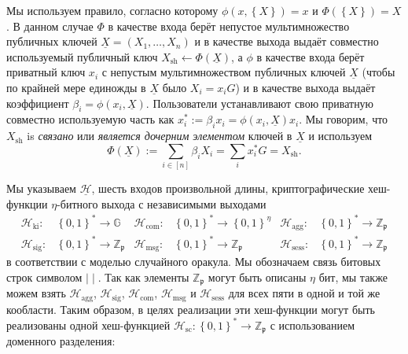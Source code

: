 \documentclass{mrl}
\theoremstyle{definition}
\numberwithin{theorem}{subsection}
\newcommand{\scalarField}{\mathbb{Z}_{\mathfrak{p}}}
\newcommand{\group}{\mathbb{G}}
\begin{document}
Мы используем правило, согласно которому $\phi(x, \left\{X\right\}) = x$ и $\Phi(\left\{X\right\}) = X$. В данном случае $\Phi$ в качестве входа берёт непустое мультимножество публичных ключей $\underline{X} = (X_1, \ldots, X_n)$ и в качестве выхода выдаёт совместно используемый публичный ключ $X_{\text{sh}} \leftarrow \Phi(\underline{X})$, а $\phi$ в качестве входа берёт приватный ключ $x_i$ с непустым мультимножеством публичных ключей $\underline{X}$ (чтобы по крайней мере единожды в $\underline{X}$ было $X_i = x_iG$) и в качестве выхода выдаёт коэффициент $\beta_i = \phi(x_i, \underline{X})$. Пользователи устанавливают свою приватную совместно используемую часть как $x_i^* := \beta_i x_i = \phi(x_i, \underline{X}) x_i$. Мы говорим, что $X_{\text{sh}}$ is \textit{связано} или \textit{является дочерним элементом} ключей в $\underline{X}$ и используем \[\Phi(\underline{X}) := \sum_{i \in [n]} \beta_i X_i = \sum_i x_i^* G = X_{\text{sh}}.\]

Мы указываем $\underline{\mathcal{H}}$, шесть входов произвольной длины, криптографические хеш-функции $\eta$-битного выхода с независимыми выходами
\begin{align*}
\mathcal{H}_{\text{ki}}:& \left\{0,1\right\}^* \to \group & \mathcal{H}_{\text{com}}:& \left\{0,1\right\}^* \to \left\{0,1\right\}^\eta & \mathcal{H}_{\text{agg}}:& \left\{0,1\right\}^* \to \scalarField \\ \mathcal{H}_{\text{sig}}:& \left\{0,1\right\}^* \to \scalarField &
\mathcal{H}_{\text{msg}}:& \left\{0,1\right\}^* \to \scalarField &
\mathcal{H}_{\text{sess}}:& \left\{0,1\right\}^* \to \scalarField
\end{align*} в соответствии с моделью случайного оракула. Мы обозначаем связь битовых строк символом $\mid \mid$. Так как элементы $\scalarField$ могут быть описаны $\eta$ бит, мы также можем взять $\mathcal{H}_{\text{agg}}$, $\mathcal{H}_{\text{sig}}$, $\mathcal{H}_{\text{com}}$, $\mathcal{H}_{\text{msg}}$ и $\mathcal{H}_{\text{sess}}$ для всех пяти в одной и той же кообласти. Таким образом, в целях реализации эти хеш-функции могут быть реализованы одной хеш-функцией $\mathcal{H}_{\text{sc}}:\left\{0,1\right\}^* \to \scalarField$ с использованием доменного разделения:
\end{document}
